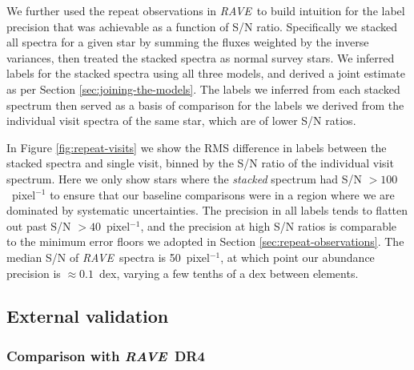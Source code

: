 \documentclass[preprint,trackchanges]{aastex}
\newcommand{\acronym}[1]{{\small{#1}}}
\newcommand{\project}[1]{\textsl{#1}}
\newcommand{\rave}{\project{\acronym{RAVE}}}
\begin{document}
We further used the repeat observations in \rave\ to build intuition for
the label precision that was achievable as a function of S/N ratio.  
Specifically we stacked all spectra for a given star by summing the 
fluxes weighted by the inverse variances, then treated the stacked spectra
as normal survey stars.  We inferred labels for the stacked spectra 
using all three models, and derived a joint estimate as per Section 
\ref{sec:joining-the-models}.  The labels we inferred from each stacked 
spectrum then served as a basis of comparison for the labels we derived 
from the individual visit spectra of the same star, which are of lower 
S/N ratios.


In Figure \ref{fig:repeat-visits} we show the RMS difference
in labels between the stacked spectra and single visit, binned by the
S/N ratio of the individual visit spectrum.  Here we only show stars
where the \emph{stacked} spectrum had S/N $>100$~pixel$^{-1}$ to ensure
that our baseline comparisons were in a region where we are dominated
by systematic uncertainties.  The precision in all labels tends to
flatten out past S/N $> 40$~pixel$^{-1}$, and the precision at high S/N
ratios is comparable to the minimum error floors we adopted in Section
\ref{sec:repeat-observations}.  The median S/N of \rave\ spectra is
50~pixel$^{-1}$, at which point our abundance precision is $\approx0.1$~dex,
varying a few tenths of a dex between elements.


\subsection{External validation}
\label{sec:external-validation}

\subsubsection{Comparison with \rave\ DR4}
\label{sec:validation-kordopatis}
\end{document}
